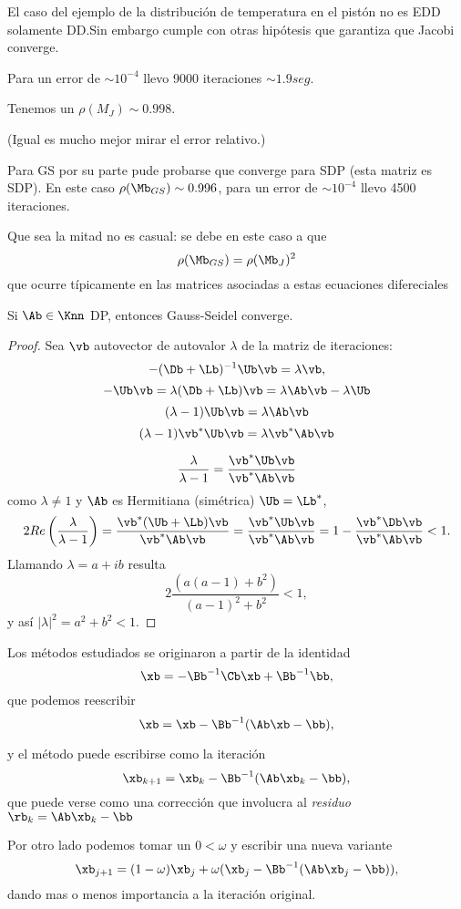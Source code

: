 El caso del ejemplo de la distribución de temperatura en el pistón no es EDD solamente DD.Sin embargo cumple con otras hipótesis que garantiza que Jacobi converge.


Para un error de $\sim 10^{-4}$ llevo 9000 iteraciones $\sim 1.9 seg$.

Tenemos un $\rho(M_J)\sim 0.998$.

(Igual es mucho mejor mirar el error relativo.)

Para GS por su parte pude probarse que converge para SDP (esta matriz es SDP).
En este caso $\rho(\Mb_{GS})\sim 0.996$, para un error de  $\sim 10^{-4}$ llevo 4500 iteraciones.

Que sea la mitad no es casual: se debe en este caso a que
$$
\rho(\Mb_{GS})=\rho(\Mb_{J})^2
$$
que ocurre típicamente en las matrices asociadas a estas ecuaciones difereciales

\tcc
\begin{prop}

 Si $\Ab\in\Knn$  DP, entonces Gauss-Seidel converge.
\end{prop}
\etcc
\begin{proof} Sea $\vb$ autovector de autovalor $\lambda$ de la matriz de iteraciones:
$$
-(\Db+\Lb)^{-1}\Ub\vb=\lambda\vb,
$$
$$
-\Ub\vb=\lambda(\Db+\Lb)\vb=\lambda \Ab \vb-\lambda \Ub
$$
$$
(\lambda-1)\Ub\vb=\lambda \Ab\vb
$$
$$
(\lambda-1)\vb^*\Ub\vb=\lambda \vb^*\Ab\vb
$$

$$
\frac{\lambda}{\lambda-1}=\frac{\vb^*\Ub\vb}{\vb^*\Ab\vb}
$$
como $\lambda\neq 1$ y $\Ab$ es Hermitiana (simétrica) $\Ub=\Lb^*$,
$$
2Re\left(\frac{\lambda}{\lambda-1}\right)=\frac{\vb^*(\Ub+\Lb)\vb}{\vb^*\Ab\vb}=\frac{\vb^*\Ub\vb}{\vb^*\Ab\vb}=1-\frac{\vb^*\Db\vb}{\vb^*\Ab\vb}<1.
$$
Llamando $\lambda=a+ib$ resulta
$$
2\frac{(a(a-1)+b^2)}{(a-1)^2+b^2}<1,
$$
y así
$|\lambda|^2=a^2+b^2<1.$
\end{proof}

Los métodos estudiados se originaron a partir de la identidad
$$
\xb=-\Bb^{-1}\Cb\xb+\Bb^{-1}\bb,
$$
que podemos reescribir
$$
\xb=\xb-\Bb^{-1}(\Ab\xb-\bb),
$$

y el método puede escribirse como la iteración
$$
\xb_{k+1}=\xb_k-\Bb^{-1}(\Ab\xb_k-\bb),
$$
que puede verse como una corrección que involucra al \emph{residuo} $\rb_k=\Ab\xb_k-\bb$

Por otro lado podemos tomar un  $0<\omega$ y escribir una nueva variante
$$
\xb_{j+1}=(1-\omega)\xb_j+
\omega(\xb_j-\Bb^{-1}(\Ab\xb_j-\bb)),
$$
dando mas o menos importancia a la iteración original.

